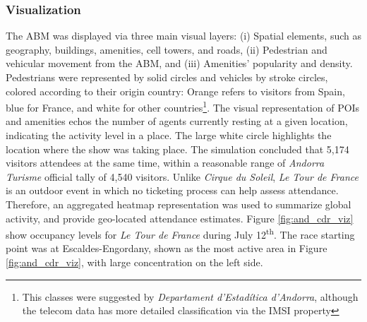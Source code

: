{{        \subsubsection{Visualization}
        {
            The ABM was displayed via three main visual layers: (i) Spatial elements, such as geography, buildings, amenities, cell towers, and roads, (ii) Pedestrian and vehicular movement from the ABM, and (iii) Amenities' popularity and density. Pedestrians were represented by solid circles and vehicles by stroke circles, colored according to their origin country: Orange refers to visitors from Spain, blue for France, and white for other countries\footnote{This classes were suggested by \textit{Departament d'Estad\'itica d'Andorra}, although the telecom data has more detailed classification via the IMSI property}.
            The visual representation of POIs and amenities echos the number of agents currently resting at a given location, indicating the activity level in a place. The large white circle highlights the location where the show was taking place. The simulation concluded that 5,174 visitors attendees at the same time, within a reasonable range of \textit{Andorra Turisme} official tally of 4,540 visitors.
            \newline
            Unlike \textit{Cirque du Soleil}, \textit{Le Tour de France} is an outdoor event in which no ticketing process can help assess attendance. Therefore, an aggregated heatmap representation was used to summarize global activity, and provide geo-located attendance estimates. Figure \eqref{fig:and_cdr_viz} show occupancy levels for \textit{Le Tour de France} during July 12\textsuperscript{th}. The race starting point was at Escaldes-Engordany, shown as the most active area in Figure \eqref{fig:and_cdr_viz}, with large concentration on the left side.

}}}
